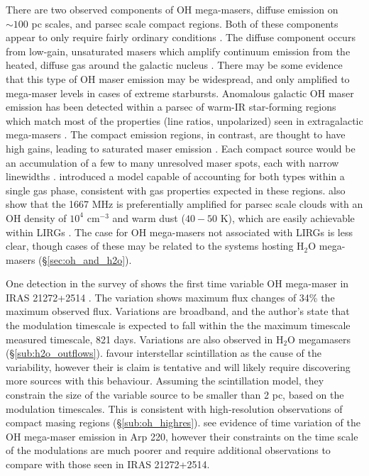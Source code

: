 There are two observed components of OH mega-masers, diffuse emission on $\sim 100$ pc scales, and parsec scale compact regions. Both of these components appear to only require fairly ordinary conditions \citep{lo2005}. The diffuse component occurs from low-gain, unsaturated masers which amplify continuum emission from the heated, diffuse gas around the galactic nucleus \citep[e.g.]{Baan_1985}. There may be some evidence that this type of OH maser emission may be widespread, and only amplified to mega-maser levels in cases of extreme starbursts. Anomalous galactic OH maser emission has been detected within a parsec of warm-IR star-forming regions which match most of the properties (line ratios, unpolarized) seen in extragalactic mega-masers \cite{Mirabel_1989}.  The compact emission regions, in contrast, are thought to have high gains, leading to saturated maser emission \citep[e.g.,]{lonsdale2002}. Each compact source would be an accumulation of a few to many unresolved maser spots, each with narrow linewidths \citet{lo2005}.  \citet{Parra_2005} introduced a model capable of accounting for both types within a single gas phase, consistent with gas properties expected in these regions. \citet{randell1995} also show that the 1667 MHz is preferentially amplified for parsec scale clouds with an OH density of $10^4$ cm$^{-3}$ and warm dust ($40-50$ K), which are easily achievable within LIRGs \citep{lo2005}. The case for OH mega-masers not associated with LIRGs is less clear, though cases of these may be related to the systems hosting H$_2$O mega-masers (\S\ref{sec:oh_and_h2o}).

One detection in the survey of \citet{darling2002_paperIII} shows the first time variable OH mega-maser in IRAS 21272+2514 \citep[$z\sim 0.15$]{darling2002_timevar}. The variation shows maximum flux changes of 34\% the maximum observed flux. Variations are broadband, and the author's state that the modulation timescale is expected to fall within the the maximum timescale measured timescale, 821 days. Variations are also observed in H$_{2}$O megamasers (\S\ref{sub:h2o_outflows}). \citet{darling2002_timevar} favour interstellar scintillation as the cause of the variability, however their is claim is tentative and will likely require discovering more sources with this behaviour. Assuming the scintillation model, they constrain the size of the variable source to be smaller than 2 pc, based on the modulation timescales. This is consistent with high-resolution observations of compact masing regions (\S\ref{sub:oh_highres}). \citet{Lonsdale_2007} see evidence of time variation of the OH mega-maser emission in Arp 220, however their constraints on the time scale of the modulations are much poorer and require additional observations to compare with those seen in IRAS 21272+2514.

